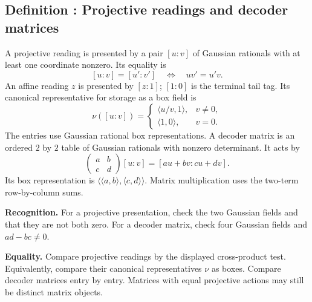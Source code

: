 \documentclass[11pt]{article}
\newcounter{definition}
\newcommand{\entry}[2]{%
  \refstepcounter{definition}\subsection*{#1 \thedefinition: #2}}
\newcommand{\definition}[1]{\entry{Definition}{#1}}
\newcommand{\checks}[2]{\begin{samepage}\par
  \textbf{Recognition.} #1\par\nopagebreak[4]
  \textbf{Equality.} #2\par\end{samepage}}
\begin{document}
\definition{Projective readings and decoder matrices}\label{def:projective}
A projective reading is presented by a pair $[u:v]$ of Gaussian
rationals with at least one coordinate nonzero. Its equality is
\[
                         [u:v]=[u':v']
                  \quad\Longleftrightarrow\quad uv'=u'v.
\]
An affine reading $z$ is presented by $[z:1]$; $[1:0]$ is the terminal
tail tag. Its canonical representative for storage as a box field is
\[
 \nu([u:v])=
 \begin{cases}
   \langle u/v,1\rangle,&v\ne0,\\
   \langle1,0\rangle,&v=0.
 \end{cases}
\]
The entries use Gaussian rational box representations.
A decoder matrix is an ordered $2$ by $2$ table of Gaussian
rationals with nonzero determinant. It acts by
\[
 \begin{pmatrix}a&b\\c&d\end{pmatrix}[u:v]=[au+bv:cu+dv].
\]
Its box representation is
$\langle\langle a,b\rangle,\langle c,d\rangle\rangle$.
Matrix multiplication uses the two-term row-by-column sums.
\checks{For a projective presentation, check the two Gaussian fields
and that they are not both zero. For a decoder matrix, check four
Gaussian fields and $ad-bc\ne0$.}
{Compare projective readings by the displayed cross-product test.
Equivalently, compare their canonical representatives $\nu$ as boxes.
Compare decoder matrices entry by entry. Matrices with equal projective
actions may still be distinct matrix objects.}
\end{document}
